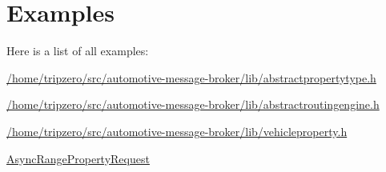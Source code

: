 \section{Examples}
Here is a list of all examples\-:\begin{DoxyCompactItemize}
\item 
\hyperlink{_2home_2tripzero_2src_2automotive-message-broker_2lib_2abstractpropertytype_8h-example}{/home/tripzero/src/automotive-\/message-\/broker/lib/abstractpropertytype.\-h}
\item 
\hyperlink{_2home_2tripzero_2src_2automotive-message-broker_2lib_2abstractroutingengine_8h-example}{/home/tripzero/src/automotive-\/message-\/broker/lib/abstractroutingengine.\-h}
\item 
\hyperlink{_2home_2tripzero_2src_2automotive-message-broker_2lib_2vehicleproperty_8h-example}{/home/tripzero/src/automotive-\/message-\/broker/lib/vehicleproperty.\-h}
\item 
\hyperlink{AsyncRangePropertyRequest-example}{Async\-Range\-Property\-Request}
\end{DoxyCompactItemize}
